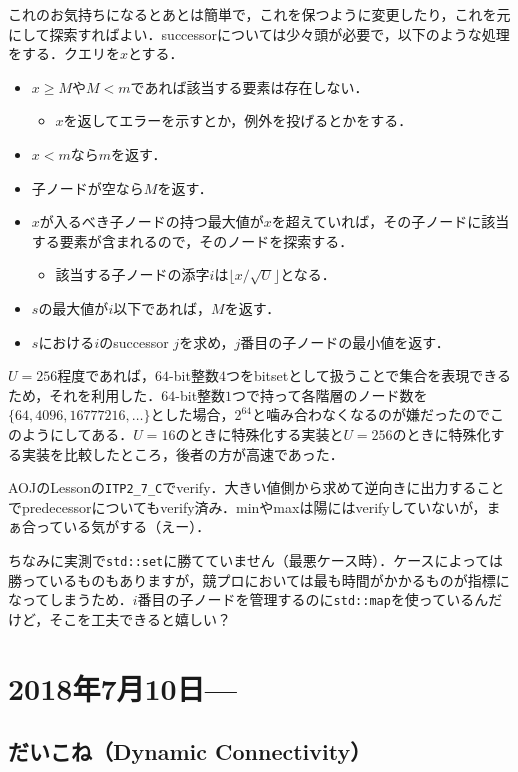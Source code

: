 \documentclass[a4paper]{jsarticle}
\begin{document}
これのお気持ちになるとあとは簡単で，これを保つように変更したり，これを元にして探索すればよい．successorについては少々頭が必要で，以下のような処理をする．クエリを$x$とする．
\begin{itemize}
\item $x\ge M$や$M<m$であれば該当する要素は存在しない．
  \begin{itemize}
  \item $x$を返してエラーを示すとか，例外を投げるとかをする．
  \end{itemize}
\item $x<m$なら$m$を返す．
\item 子ノードが空なら$M$を返す．
\item $x$が入るべき子ノードの持つ最大値が$x$を超えていれば，その子ノードに該当する要素が含まれるので，そのノードを探索する．
  \begin{itemize}
  \item 該当する子ノードの添字$i$は$\lfloor x/\sqrt{U}\rfloor$となる．
  \end{itemize}
\item $s$の最大値が$i$以下であれば，$M$を返す．
\item $s$における$i$のsuccessor $j$を求め，$j$番目の子ノードの最小値を返す．
\end{itemize}

$U=256$程度であれば，$64$-bit整数$4$つをbitsetとして扱うことで集合を表現できるため，それを利用した．$64$-bit整数$1$つで持って各階層のノード数を$\{64, 4096, 16777216, \ldots\}$とした場合，$2^{64}$と噛み合わなくなるのが嫌だったのでこのようにしてある．$U=16$のときに特殊化する実装と$U=256$のときに特殊化する実装を比較したところ，後者の方が高速であった．

AOJのLessonの\texttt{ITP2\_7\_C}でverify．大きい値側から求めて逆向きに出力することでpredecessorについてもverify済み．minやmaxは陽にはverifyしていないが，まぁ合っている気がする（えー）．

ちなみに実測で\texttt{std::set}に勝てていません（最悪ケース時）．ケースによっては勝っているものもありますが，競プロにおいては最も時間がかかるものが指標になってしまうため．$i$番目の子ノードを管理するのに\texttt{std::map}を使っているんだけど，そこを工夫できると嬉しい？

\section{2018年7月10日---}
\subsection{だいこね（Dynamic Connectivity）}
\end{document}
